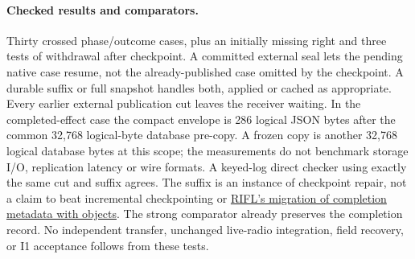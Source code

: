 \documentclass{article}
\begin{document}
\paragraph{Checked results and comparators.}
Thirty crossed phase/outcome cases, plus an initially missing right
and three tests of withdrawal after checkpoint. A committed external
seal lets the pending native case resume, not the already-published
case omitted by the checkpoint. A durable suffix or full snapshot
handles both, applied or cached as appropriate. Every earlier
external publication cut leaves the receiver waiting. In the
completed-effect case the compact envelope is 286 logical JSON
bytes after the common 32,768 logical-byte database pre-copy.
A frozen copy is another 32,768 logical database bytes at this scope;
the measurements do not benchmark storage I/O, replication latency
or wire formats. A keyed-log direct checker using exactly the same
cut and suffix agrees. The suffix is an instance of checkpoint
repair, not a claim to beat incremental checkpointing or
\href{https://web.stanford.edu/~ouster/cgi-bin/papers/rifl.pdf}
{RIFL's migration of completion metadata with objects}. The strong
comparator already preserves the completion record. No independent
transfer, unchanged live-radio integration, field recovery, or I1
acceptance follows from these tests.
\end{document}
